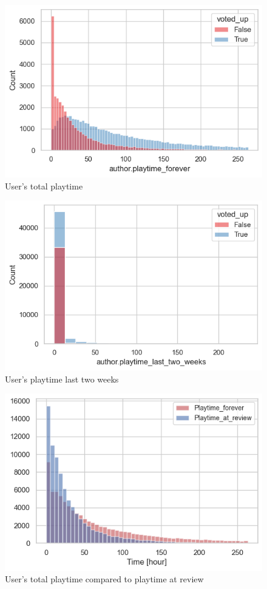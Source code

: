 \documentclass[12pt]{article}
\begin{document}
\begin{figure}[H]
\centering
\includegraphics[scale=0.7]{images/forever.png}
\caption{User's total playtime}
\label{fig:forever}
\end{figure}

\begin{figure}[H]
\centering
\includegraphics[scale=0.7]{images/last two weeks.png}
\caption{User's playtime last two weeks}
\label{fig:last two weeks}
\end{figure}

\begin{figure}[H]
\centering
\includegraphics[scale=0.7]{images/forever v at_review.png}
\caption{User's total playtime compared to playtime at review}
\label{fig:forever v at_review}
\end{figure}
\end{document}
